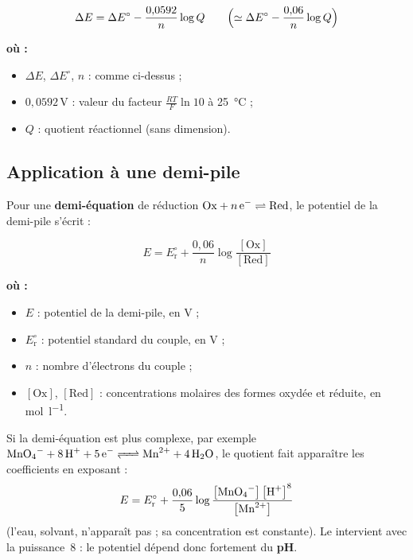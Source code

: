 \documentclass[11pt,a4paper]{article}
\newenvironment{ou}{%
  \par\smallskip\noindent\textbf{où :}\nopagebreak
  \begin{itemize}[leftmargin=1.8em,topsep=2pt,itemsep=1.5pt,parsep=0pt]}%
  {\end{itemize}}
\newcommand{\cc}[1]{\left[#1\right]}            %
\newcommand{\fem}{\ensuremath{\Delta E}}        %
\begin{document}
\begin{formule}
\[
\fem=\fem^{\circ}-\frac{0{,}0592}{n}\log Q\qquad\Bigl(\simeq\fem^{\circ}-\frac{0{,}06}{n}\log Q\Bigr)
\]
\begin{ou}
  \item $\fem$, $\fem^{\circ}$, $n$ : comme ci-dessus ;
  \item $0{,}0592$\,V : valeur du facteur $\tfrac{RT}{F}\ln 10$ à \SI{25}{\celsius} ;
  \item $Q$ : quotient réactionnel (sans dimension).
\end{ou}
\end{formule}

\subsection{Application à une demi-pile}

Pour une \textbf{demi-équation} de réduction $\mathrm{Ox}+n\,\ce{e^-}\rightleftharpoons\mathrm{Red}$,
le potentiel de la demi-pile s'écrit :

\begin{formule}
\[
E=E_{\mathrm{r}}^{\circ}+\frac{0{,}06}{n}\log\frac{[\mathrm{Ox}]}{[\mathrm{Red}]}
\]
\begin{ou}
  \item $E$ : potentiel de la demi-pile, en V ;
  \item $E_{\mathrm{r}}^{\circ}$ : potentiel standard du couple, en V ;
  \item $n$ : nombre d'électrons du couple ;
  \item $[\mathrm{Ox}]$, $[\mathrm{Red}]$ : concentrations molaires des formes oxydée et réduite,
        en \si{mol\per\litre}.
\end{ou}
\end{formule}

\begin{remarque}
Si la demi-équation est plus complexe, par exemple
$\ce{MnO4^- + 8 H+ + 5 e^- <=> Mn^{2+} + 4 H2O}$, le quotient fait apparaître les coefficients
en exposant :
\[
E=E_{\mathrm{r}}^{\circ}+\frac{0{,}06}{5}\log\frac{\cc{\ce{MnO4^-}}\cc{\ce{H+}}^{8}}{\cc{\ce{Mn^{2+}}}}
\]
(l'eau, solvant, n'apparaît pas ; sa concentration est constante). Le  intervient avec la
puissance~8 : le potentiel dépend donc fortement du \textbf{pH}.
\end{remarque}
\end{document}
